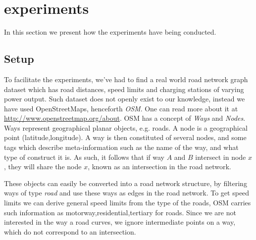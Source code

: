 \section{experiments} %
\label{sec:experiments}
In this section we present how the experiments have being conducted.
\subsection{Setup} %
\label{sub:setup}
To facilitate the experiments, we've had to find a real world road network graph dataset which has road distances, speed limits and charging stations of varying power output. Such dataset does not openly exist to our knowledge, instead we have used OpenStreetMaps, henceforth \textit{OSM}. One can read more about it at \url{http://www.openstreetmap.org/about}. OSM has a concept of \textit{Ways} and \textit{Nodes}. Ways represent geographical planar objects, e.g. roads. A node is a geographical point (latitude,longitude). A way is then constituted of several nodes, and some tags which describe meta-information such as the name of the way, and what type of construct it is. As such, it follows that if way $A$ and $B$ intersect in node $x$, they will share the node $x$, known as an intersection in the road network. 

These objects can easily be converted into a road network structure, by filtering ways of type \textit{road} and use these ways as edges in the road network. To get speed limits we can derive general speed limits from the type of the roads, OSM carries such information as motorway,residential,tertiary for roads. Since we are not interested in the way a road curves, we ignore intermediate points on a way, which do not correspond to an intersection.  

